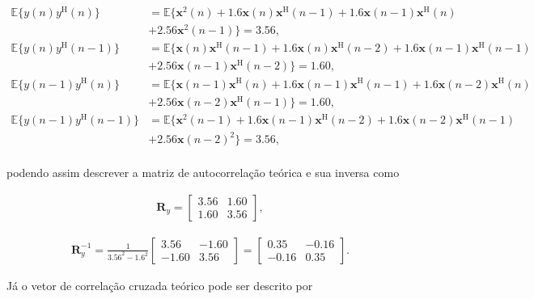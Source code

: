 \begin{align*}
    \mathbb{E}\{y(n)y^{\text{H}}(n)\} &= \mathbb{E}\{ \mathbf{x}^{2}(n) + 1.6 \mathbf{x}(n) \mathbf{x}^{\text{H}}(n - 1) + 1.6 \mathbf{x}(n - 1) \mathbf{x}^{\text{H}} (n) \\
    &+ 2.56 \mathbf{x}^{2}(n - 1) \} = 3.56, \\
    \mathbb{E}\{y(n)y^{\text{H}}(n - 1)\} &= \mathbb{E}\{ \mathbf{x}(n) \mathbf{x}^{\text{H}}(n - 1) + 1.6 \mathbf{x}(n) \mathbf{x}^{\text{H}}(n - 2) + 1.6 \mathbf{x}(n - 1) \mathbf{x}^{\text{H}} (n - 1) \\ 
    &+ 2.56 \mathbf{x}(n - 1) \mathbf{x}^{\text{H}}(n - 2) \} = 1.60, \\
    \mathbb{E}\{y(n - 1)y^{\text{H}}(n)\} &= \mathbb{E}\{ \mathbf{x}(n - 1) \mathbf{x}^{\text{H}}(n) + 1.6 \mathbf{x}(n - 1) \mathbf{x}^{\text{H}}(n - 1) + 1.6 \mathbf{x}(n - 2) \mathbf{x}^{\text{H}} (n) \\ 
    &+ 2.56 \mathbf{x}(n - 2) \mathbf{x}^{\text{H}}(n - 1) \} = 1.60, \\
    \mathbb{E}\{y(n - 1)y^{\text{H}}(n - 1)\} &= \mathbb{E}\{ \mathbf{x}^{2}(n - 1) + 1.6 \mathbf{x}(n - 1) \mathbf{x}^{\text{H}}(n - 2) + 1.6 \mathbf{x}(n - 2) \mathbf{x}^{\text{H}} (n - 1) \\ 
    &+ 2.56 \mathbf{x}(n - 2)^{2} \} = 3.56, \\
\end{align*}

podendo assim descrever a matriz de autocorrelação teórica e sua inversa como

\begin{align}
    \mathbf{R}_{y} =
    \begin{bmatrix}
        3.56 & 1.60 \\
        1.60 & 3.56
    \end{bmatrix},
\end{align}

\begin{align}
    \mathbf{R}^{-1}_{y} = \frac{1}{3.56^{2} - 1.6^{2}}
    \begin{bmatrix}
        3.56 &  -1.60 \\
        -1.60 & 3.56
    \end{bmatrix} =
    \begin{bmatrix}
        0.35 &  -0.16 \\
        -0.16 & 0.35
    \end{bmatrix}.
\end{align}

Já o vetor de correlação cruzada teórico pode ser descrito por

